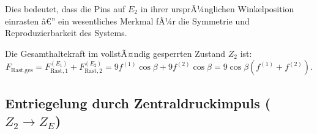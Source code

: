 ﻿\documentclass[12pt, a4paper]{article}
\theoremstyle{remark}
\begin{document}
Dies bedeutet, dass die Pins auf $E_2$ in ihrer ursprÃ¼nglichen Winkelposition einrasten â€”
ein wesentliches Merkmal fÃ¼r die Symmetrie und Reproduzierbarkeit des Systems.

Die Gesamthaltekraft im vollstÃ¤ndig gesperrten Zustand $Z_2$ ist:
\begin{equation}
  \boxed{F_{\text{Rast,ges}} = F_{\text{Rast},1}^{(E_1)} + F_{\text{Rast},2}^{(E_2)} = 9 f^{(1)}\cos\beta + 9 f^{(2)}\cos\beta = 9\cos\beta\left(f^{(1)} + f^{(2)}\right).}
\end{equation}

\subsection{Entriegelung durch Zentraldruckimpuls ($Z_2 \to Z_E$)}
\end{document}
